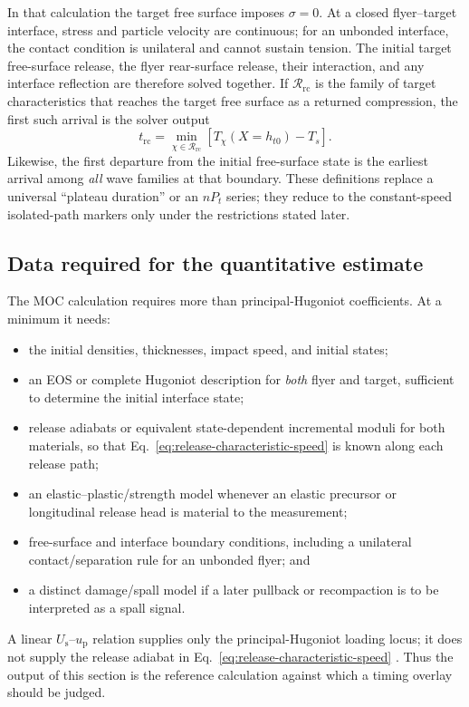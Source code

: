 \documentclass[11pt]{article}
\newcommand{\Us}[1][]{U_{\mathrm{s}#1}}
\newcommand{\up}[1][]{u_{\mathrm{p}#1}}
\newcommand{\sig}{\sigma}
\newcommand{\Pt}{P_t}
\begin{document}
In that calculation the target free surface imposes $\sig=0$.  At a closed
flyer--target interface, stress and particle velocity are continuous; for an
unbonded interface, the contact condition is unilateral and cannot sustain
tension.  The initial target free-surface release, the flyer rear-surface
release, their interaction, and any interface reflection are therefore solved
together.  If $\mathcal R_{\mathrm{rc}}$ is the family of target
characteristics that reaches the target free surface as a returned compression,
the first such arrival is the solver output
\begin{equation}
  t_{\mathrm{rc}}=\min_{\chi\in\mathcal R_{\mathrm{rc}}}
  \left[T_\chi(X=h_{t0})-T_s\right].
  \label{eq:exact-recompression-arrival}
\end{equation}
Likewise, the first departure from the initial free-surface state is the
earliest arrival among \emph{all} wave families at that boundary.  These
definitions replace a universal ``plateau duration'' or an $n\Pt$ series;
they reduce to the constant-speed isolated-path markers only under the
restrictions stated later.

\subsection{Data required for the quantitative estimate}

The MOC calculation requires more than principal-Hugoniot coefficients.  At a
minimum it needs:
\begin{itemize}
  \item the initial densities, thicknesses, impact speed, and initial states;
  \item an EOS or complete Hugoniot description for \emph{both} flyer and
        target, sufficient to determine the initial interface state;
  \item release adiabats or equivalent state-dependent incremental moduli for
        both materials, so that Eq.~\eqref{eq:release-characteristic-speed}
        is known along each release path;
  \item an elastic--plastic/strength model whenever an elastic precursor or
        longitudinal release head is material to the measurement;
  \item free-surface and interface boundary conditions, including a unilateral
        contact/separation rule for an unbonded flyer; and
  \item a distinct damage/spall model if a later pullback or recompaction is
        to be interpreted as a spall signal.
\end{itemize}
A linear $\Us$--$\up$ relation supplies only the principal-Hugoniot loading
locus; it does not supply the release adiabat in
Eq.~\eqref{eq:release-characteristic-speed}
\cite{LyzengaAhrens1978,Kerley2008}.  Thus the output of this section is the
reference calculation against which a timing overlay should be judged.
\end{document}
